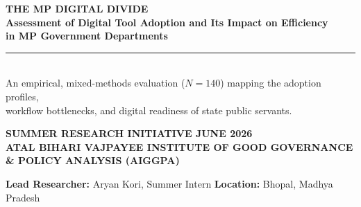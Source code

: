 \documentclass[11pt,a4paper]{article}
\begin{document}

\begin{titlepage}
  \vspace*{2.0cm}
  \begin{center}
    
    \vspace{1.0cm}
    {\fontsize{26}{30}\selectfont\bfseries\color{navyblue} THE MP DIGITAL DIVIDE}\\[8pt]
    {\fontsize{14}{17}\selectfont\bfseries\color{accentteal} Assessment of Digital Tool Adoption and Its Impact on Efficiency\\in MP Government Departments}\\[1.5cm]
    
    \rule{0.4\textwidth}{1.5pt}\\[1.0cm]
    
    {\fontsize{11}{14}\selectfont\color{darkgray}
      An empirical, mixed-methods evaluation ($N=140$) mapping the adoption profiles,\\workflow bottlenecks, and digital readiness of state public servants.\\[1.5cm]
    }
    
    \begin{tcolorbox}[colback=navyblue,colframe=navyblue,width=0.8\textwidth,arc=4pt,halign=center,top=10pt,bottom=10pt]
      \color{white}\bfseries\fontsize{10.5}{13}\selectfont
      SUMMER RESEARCH INITIATIVE \quad\textbar\quad JUNE 2026\\
      \fontsize{9}{11}\selectfont ATAL BIHARI VAJPAYEE INSTITUTE OF GOOD GOVERNANCE \& POLICY ANALYSIS (AIGGPA)
    \end{tcolorbox}
    
    \vfill
    {\small\color{darkgray}\textbf{Lead Researcher:} Aryan Kori, Summer Intern \quad\textbar\quad \textbf{Location:} Bhopal, Madhya Pradesh}
  \end{center}
\end{titlepage}
\end{document}
